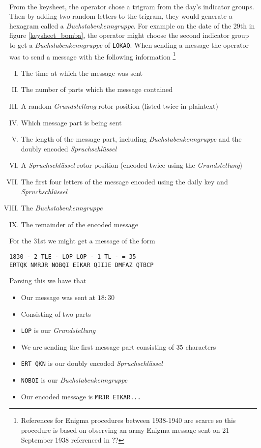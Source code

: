 \\From the keysheet, the operator chose a trigram from the day's indicator groups. Then by adding two random letters to the trigram, they would generate a hexagram called a \emph{Buchstabenkenngruppe}. For example on the date of the 29th in figure \ref{keysheet_bomba}, the operator might choose the second indicator group to get a \emph{Buchstabenkenngruppe} of \texttt{LOKAO}. When sending a message the operator was to send a message with the following information \footnote{References for Enigma procedures between 1938-1940 are scarce so this procedure is based on observing an army Enigma message sent on 21 September 1938 referenced in ??}
\begin{enumerate}[I.]
	\item The time at which the message was sent
	\item The number of parts which the message contained
	\item A random \emph{Grundstellung} rotor position (listed twice in plaintext)
	\item Which message part is being sent
	\item The length of the message part, including \emph{Buchstabenkenngruppe} and the doubly encoded \emph{Spruchschlüssel}
	\item A \emph{Spruchschlüssel} rotor position (encoded twice using the \emph{Grundstellung})
	\item The first four letters of the message encoded using the daily key and
	      \emph{Spruchschlüssel}
	\item The \emph{Buchstabenkenngruppe}
	\item The remainder of the encoded message
\end{enumerate}

\noindent For the 31st we might get a message of the form

\begin{center}
	\texttt{1830 - 2 TLE - LOP LOP - 1 TL - = 35}\\
	\texttt{ERTQK NMRJR NOBQI EIKAR QIIJE DMFAZ QTBCP}
\end{center}
Parsing this we have that
\begin{itemize}
	\item Our message was sent at $18:30$
	\item Consisting of two parts
	\item \texttt{LOP} is our \emph{Grundstellung}
	\item We are sending the first message part consisting of $35$ characters
	\item \texttt{ERT QKN} is our doubly encoded \emph{Spruchschlüssel}
	\item \texttt{NOBQI} is our \emph{Buchstabenkenngruppe}
	\item Our encoded message is \texttt{MRJR EIKAR...}
\end{itemize}

